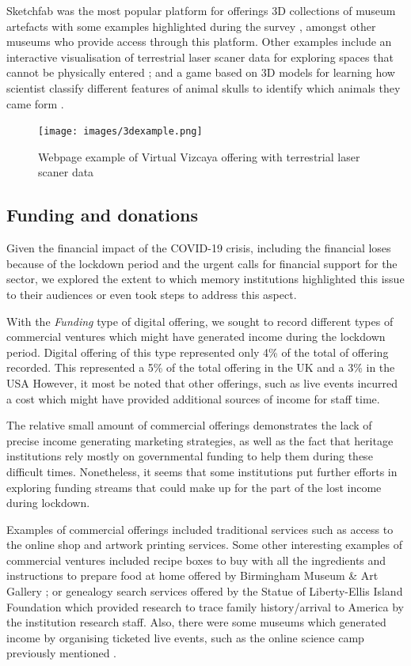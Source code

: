 \documentclass{egpubl}
\begin{document}
Sketchfab was the most popular platform for offerings 3D collections of museum artefacts with some examples highlighted during the survey \cite{britishsketchfab, ScienceMuseumsketchfab}, amongst other museums who provide access through this platform. Other examples include an interactive visualisation of terrestrial laser scaner data for exploring spaces that cannot be physically entered \cite{vizcayalidar}; and a game based on 3D models for learning how scientist classify different features of animal skulls to identify which animals they came form \cite{scieskull}.

\begin{figure}[h]
  \centering
  \texttt{[image: images/3dexample.png]}
  \caption{\label{fig:3dexample}
  Webpage example of Virtual Vizcaya offering with terrestrial laser scaner data}
\end{figure}

\subsection{Funding and donations} 
\label{don}

Given the financial impact of the COVID-19 crisis, including the financial loses because of the lockdown period and the urgent calls for financial support for the sector, we explored the extent to which memory institutions highlighted this issue to their audiences or even took steps to address this aspect. 


With the \emph{Funding} type of digital offering, we sought to record different types of commercial ventures which might have generated income during the lockdown period. Digital offering of this type represented only 4\% of the total of offering recorded. This represented a 5\% of the total offering in the UK and a 3\% in the USA However, it most be noted that other offerings, such as live events incurred a cost which might have provided additional sources of income for staff time. 

The relative small amount of commercial offerings demonstrates the lack of precise income generating marketing strategies, as well as the fact that heritage institutions rely mostly on governmental funding to help them during these difficult times. Nonetheless, it seems that some institutions put further efforts in exploring funding streams that could make up for the part of the lost income during lockdown.


Examples of commercial offerings included traditional services such as access to the online shop and artwork printing services. Some other interesting examples of commercial ventures included recipe boxes to buy with all the ingredients and instructions to prepare food at home offered by Birmingham Museum \& Art Gallery ; or genealogy search services offered by the Statue of Liberty-Ellis Island Foundation  which provided research to trace family history/arrival to America by the institution research staff. Also, there were some museums which generated income by organising ticketed live events, such as the online science camp previously mentioned \cite{fieldmuseum}. 
\end{document}
